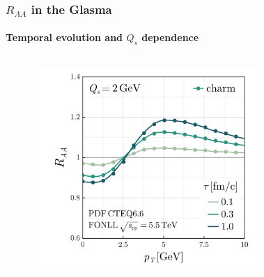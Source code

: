 \documentclass[aspectratio=169,11pt,usenames,dvipsnames]{beamer}
\begin{document}
\begin{frame}
\begin{center}
\begin{columns}[onlytextwidth,t]
\begin{figure}
            \end{figure}
        \end{columns}    
    \end{center}
\end{frame}

\begin{frame}[noframenumbering]
    \frametitle{$R_{AA}$ in the Glasma}
    \framesubtitle{Temporal evolution and $Q_s$ dependence}
    {\vspace{-5pt}
    \begin{center}
        \begin{columns}[onlytextwidth,t]
           \begin{figure}
                \centering
                \includegraphics[width=\columnwidth]{images/clean_raa_tau_dep_quarks_charmQs_2.0_fonll_energy_5500_pdf_cteq.png}
            \end{figure}
            \vspace{-20pt}
            \begin{figure}
                \centering

\end{figure}
\end{columns}
\end{center}}
\end{frame}
\end{document}

